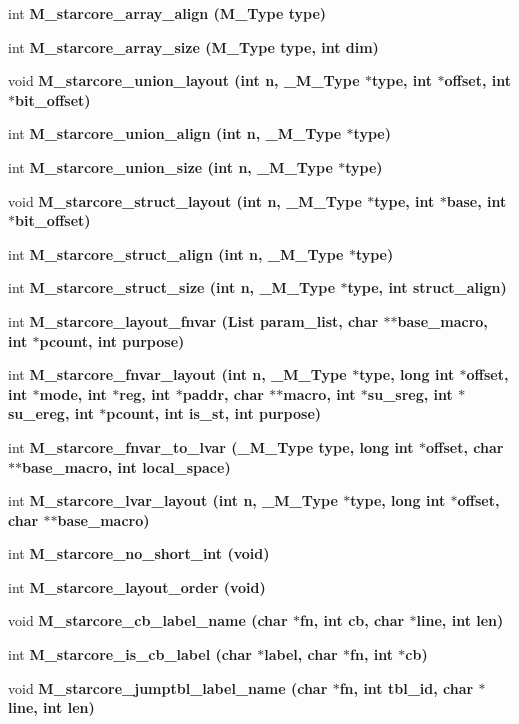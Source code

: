 \begin{CompactItemize}
\item 
int \bf{M\_\-starcore\_\-array\_\-align} (\bf{M\_\-Type} type)
\item 
int \bf{M\_\-starcore\_\-array\_\-size} (\bf{M\_\-Type} type, int dim)
\item 
void \bf{M\_\-starcore\_\-union\_\-layout} (int n, \bf{\_\-M\_\-Type} $\ast$type, int $\ast$offset, int $\ast$bit\_\-offset)
\item 
int \bf{M\_\-starcore\_\-union\_\-align} (int n, \bf{\_\-M\_\-Type} $\ast$type)
\item 
int \bf{M\_\-starcore\_\-union\_\-size} (int n, \bf{\_\-M\_\-Type} $\ast$type)
\item 
void \bf{M\_\-starcore\_\-struct\_\-layout} (int n, \bf{\_\-M\_\-Type} $\ast$type, int $\ast$base, int $\ast$bit\_\-offset)
\item 
int \bf{M\_\-starcore\_\-struct\_\-align} (int n, \bf{\_\-M\_\-Type} $\ast$type)
\item 
int \bf{M\_\-starcore\_\-struct\_\-size} (int n, \bf{\_\-M\_\-Type} $\ast$type, int struct\_\-align)
\item 
int \bf{M\_\-starcore\_\-layout\_\-fnvar} (\bf{List} param\_\-list, char $\ast$$\ast$base\_\-macro, int $\ast$pcount, int purpose)
\item 
int \bf{M\_\-starcore\_\-fnvar\_\-layout} (int n, \bf{\_\-M\_\-Type} $\ast$type, long int $\ast$offset, int $\ast$\bf{mode}, int $\ast$reg, int $\ast$paddr, char $\ast$$\ast$macro, int $\ast$su\_\-sreg, int $\ast$su\_\-ereg, int $\ast$pcount, int is\_\-st, int purpose)
\item 
int \bf{M\_\-starcore\_\-fnvar\_\-to\_\-lvar} (\bf{\_\-M\_\-Type} type, long int $\ast$offset, char $\ast$$\ast$base\_\-macro, int local\_\-space)
\item 
int \bf{M\_\-starcore\_\-lvar\_\-layout} (int n, \bf{\_\-M\_\-Type} $\ast$type, long int $\ast$offset, char $\ast$$\ast$base\_\-macro)
\item 
int \bf{M\_\-starcore\_\-no\_\-short\_\-int} (void)
\item 
int \bf{M\_\-starcore\_\-layout\_\-order} (void)
\item 
void \bf{M\_\-starcore\_\-cb\_\-label\_\-name} (char $\ast$fn, int cb, char $\ast$line, int len)
\item 
int \bf{M\_\-starcore\_\-is\_\-cb\_\-label} (char $\ast$label, char $\ast$fn, int $\ast$cb)
\item 
void \bf{M\_\-starcore\_\-jumptbl\_\-label\_\-name} (char $\ast$fn, int tbl\_\-id, char $\ast$line, int len)

\end{CompactItemize}
